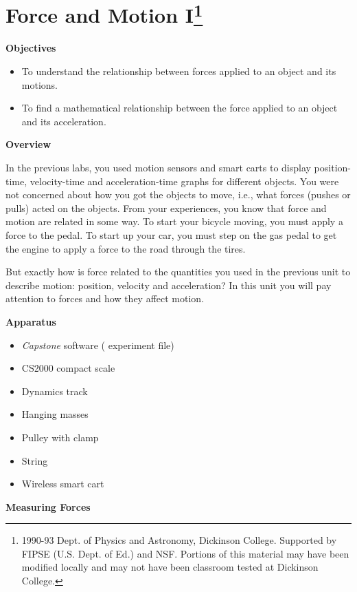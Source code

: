 
\section{Force and Motion I\footnote{
1990-93 Dept. of Physics and Astronomy, Dickinson College. Supported by FIPSE
(U.S. Dept. of Ed.) and NSF. Portions of this material may have been modified
locally and may not have been classroom tested at Dickinson College.
}}


\makelabheader %

\medskip
\textbf{Objectives }

\begin{itemize}[nosep]
\item To understand the relationship between forces applied to an object and its motions. 
\item To find a mathematical relationship between the force applied to an object and its acceleration.
\end{itemize}
\textbf{Overview }

In the previous labs, you used motion sensors and smart carts to display position-time,
velocity-time and acceleration-time graphs for different objects. You were not concerned about how you got the objects to move, i.e., what forces (pushes or pulls) acted on the objects. From your experiences, you know that force and motion are related in some way. To start your bicycle moving, you must apply a force to the pedal. To start up your car, you must step on the
gas pedal to get the engine to apply a force to the road through the tires.

But exactly how is force related to the quantities you used in the previous
unit to describe motion: position, velocity and acceleration? In this unit you
will pay attention to forces and how they affect motion. 

\medskip
\textbf{Apparatus} 

\begin{itemize} [nosep]
\item \textit{Capstone} software ( experiment file)
\item CS2000 compact scale
\item Dynamics track
\item Hanging masses
\item Pulley with clamp
\item String
\item Wireless smart cart
\end{itemize}
\textbf{Measuring Forces} 

